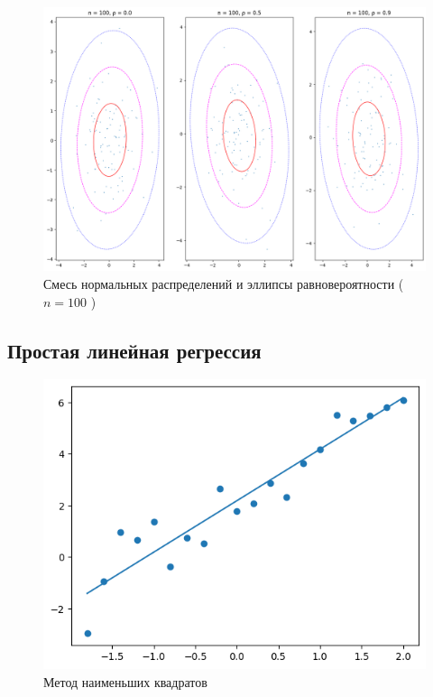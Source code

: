 \documentclass[12pt,a4paper]{article}
\begin{document}
	\begin{figure}[htbp!]
		\begin{center}
			\includegraphics[width = 0.8\linewidth]{graphics/lab5_ellips_100}
			\caption{Смесь нормальных распределений и эллипсы равновероятности
			( \( n = 100 \) )}
		\end{center}
	\end{figure}

	\clearpage

	\subsection{Простая линейная регрессия}

	\begin{figure}[htbp!]
		\begin{center}
			\includegraphics[width = 0.75\linewidth]{graphics/lab6_sq}
			\caption{Метод наименьших квадратов}
		\end{center}
	\end{figure}
\end{document}
